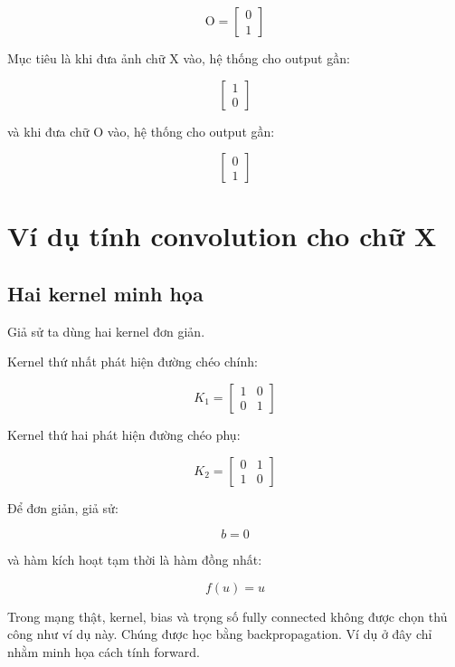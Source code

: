 \documentclass[12pt,a4paper]{report}
\begin{document}
\[
    \text{O}
    =
    \begin{bmatrix}
    0\\1
    \end{bmatrix}
\]

Mục tiêu là khi đưa ảnh chữ X vào, hệ thống cho output gần:

\[
    \begin{bmatrix}
    1\\0
    \end{bmatrix}
\]

và khi đưa chữ O vào, hệ thống cho output gần:

\[
    \begin{bmatrix}
    0\\1
    \end{bmatrix}
\]

\chapter{Ví dụ tính convolution cho chữ X}

\section{Hai kernel minh họa}

Giả sử ta dùng hai kernel đơn giản.

Kernel thứ nhất phát hiện đường chéo chính:

\[
    K_1 =
    \begin{bmatrix}
    1 & 0\\
    0 & 1
    \end{bmatrix}
\]

Kernel thứ hai phát hiện đường chéo phụ:

\[
    K_2 =
    \begin{bmatrix}
    0 & 1\\
    1 & 0
    \end{bmatrix}
\]

Để đơn giản, giả sử:

\[
    b=0
\]

và hàm kích hoạt tạm thời là hàm đồng nhất:

\[
    f(u)=u
\]

\begin{luuy}
Trong mạng thật, kernel, bias và trọng số fully connected không được chọn thủ công như ví dụ này. Chúng được học bằng backpropagation. Ví dụ ở đây chỉ nhằm minh họa cách tính forward.
\end{luuy}
\end{document}
